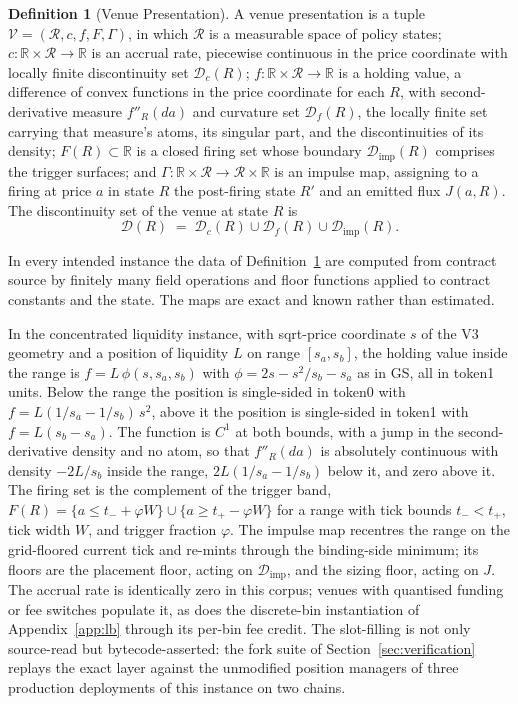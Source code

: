 \documentclass[11pt,a4paper]{article}
\theoremstyle{definition}
\newtheorem{definition}{Definition}
\theoremstyle{plain}
\theoremstyle{remark}
\begin{document}
\begin{definition}[Venue Presentation]\label{def:venue}
A venue presentation is a tuple $\mathcal{V} = (\mathcal{R}, c, f, F,\Gamma)$, in which $\mathcal{R}$ is a measurable space of policy states; $c : \mathbb{R} \times \mathcal{R} \to \mathbb{R}$ is 
an accrual rate, piecewise continuous in the price coordinate with locally finite discontinuity set $\mathcal{D}_c(R)$; $f : \mathbb{R}\times \mathcal{R} \to \mathbb{R}$ is a holding value, a 
difference of convex functions in the price coordinate for each $R$, with second-derivative measure $f''_R(da)$ and curvature set $\mathcal{D}_f(R)$, the locally finite set carrying that measure's
atoms, its singular part, and the discontinuities of its density; $F(R) \subset \mathbb{R}$ is a closed firing set whose boundary $\mathcal{D}_{\mathrm{imp}}(R)$ comprises the trigger
surfaces; and $\Gamma : \mathbb{R} \times \mathcal{R} \to \mathcal{R}\times \mathbb{R}$ is an impulse map, assigning to a firing at price $a$ in state $R$ the post-firing state $R'$ and an emitted 
flux $J(a,R)$. The discontinuity set of the venue at state $R$ is
\[
\mathcal{D}(R) \;=\; \mathcal{D}_c(R) \cup \mathcal{D}_f(R) \cup
\mathcal{D}_{\mathrm{imp}}(R).
\]
\end{definition}

In every intended instance the data of Definition~\ref{def:venue} are computed from contract source by finitely many field operations and floor functions applied to contract constants and the state. 
The maps are exact and known rather than estimated.

In the concentrated liquidity instance, with sqrt-price coordinate $s$ of the V3 geometry\cite{adams2021} and a position of liquidity $L$ on range $[s_a, s_b]$, the holding value inside the range is $f =
L\,\phi(s, s_a, s_b)$ with $\phi = 2s - s^2/s_b - s_a$ as in GS, all in token1 units. Below the range the position is single-sided in token0 with $f = L(1/s_a - 1/s_b)\, s^2$, above it the position is 
single-sided in token1 with $f = L(s_b - s_a)$. The function is $C^1$ at both bounds, with a jump in the second-derivative density and no atom, so that $f''_R(da)$ is absolutely continuous with 
density $-2L/s_b$ inside the range, $2L(1/s_a - 1/s_b)$ below it, and zero above it. The firing set is the complement of the trigger band, $F(R) = \{a \le t_- + \varphi
W\} \cup \{a \ge t_+ - \varphi W\}$ for a range with tick bounds $t_-< t_+$, tick width $W$, and trigger fraction $\varphi$.\cite{ryan2026omqm} The impulse map recentres the range on
the grid-floored current tick and re-mints through the binding-side minimum; its floors are the placement floor, acting on $\mathcal{D}_{\mathrm{imp}}$, and the sizing floor, acting on $J$. The
accrual rate is identically zero in this corpus; venues with quantised funding or fee switches populate it, as does the discrete-bin instantiation of Appendix~\ref{app:lb} through its per-bin fee credit. 
The slot-filling is not only source-read but bytecode-asserted: the fork suite of Section~\ref{sec:verification} replays the exact layer against the unmodified position managers of three production 
deployments of this instance on two chains.
\end{document}
